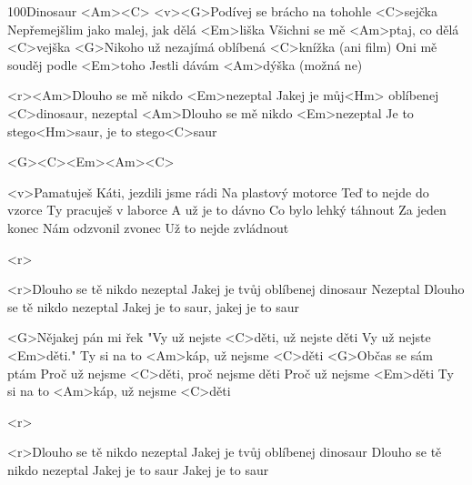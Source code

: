 \begin{song}[Kruh 19]{100}{Dinosaur}{}
<Am><C>
<v><G>Podívej se brácho na tohohle <C>sejčka
Nepřemejšlim jako malej, jak dělá <Em>liška
Všichni se mě <Am>ptaj, co dělá <C>vejška
<G>Nikoho už nezajímá oblíbená <C>knížka (ani film)
Oni mě souděj podle <Em>toho
Jestli dávám <Am>dýška (možná ne)

<r><Am>Dlouho se mě nikdo <Em>nezeptal
Jakej je můj<Hm> oblíbenej <C>dinosaur, nezeptal
<Am>Dlouho se mě nikdo <Em>nezeptal
Je to stego<Hm>saur, je to stego<C>saur

<G><C><Em><Am><C>

<v>Pamatuješ Káti, jezdili jsme rádi
Na plastový motorce
Teď to nejde do vzorce
Ty pracuješ v laborce
A už je to dávno
Co bylo lehký táhnout
Za jeden konec
Nám odzvonil zvonec
Už to nejde zvládnout

<r>

<r>Dlouho se tě nikdo nezeptal
Jakej je tvůj oblíbenej dinosaur
Nezeptal
Dlouho se tě nikdo nezeptal
Jakej je to saur, jakej je to saur

<G>Nějakej pán mi řek
"Vy už nejste <C>děti, už nejste děti
Vy už nejste <Em>děti."
Ty si na to <Am>káp, už nejsme <C>děti
<G>Občas se sám ptám
Proč už nejsme <C>děti, proč nejsme děti
Proč už nejsme <Em>děti
Ty si na to <Am>káp, už nejsme <C>děti

<r>

<r>Dlouho se tě nikdo nezeptal
Jakej je tvůj oblíbenej dinosaur
Dlouho se tě nikdo nezeptal
Jakej je to saur
Jakej je to saur
\end{song}
